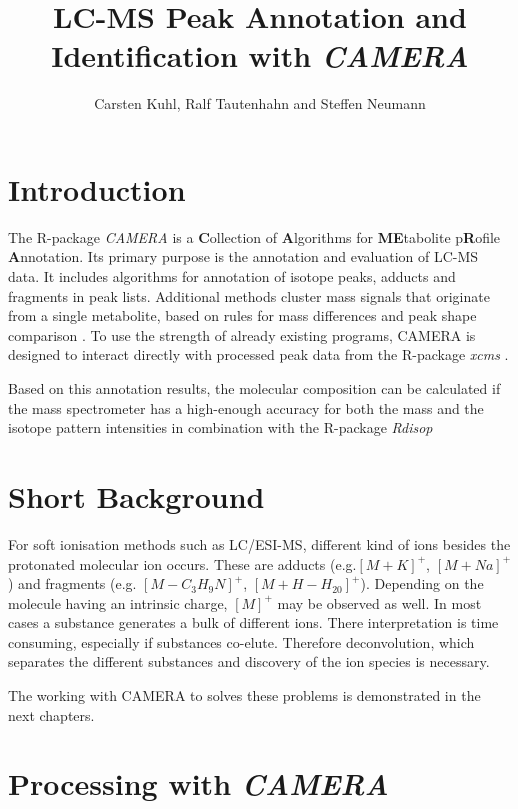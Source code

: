 \documentclass[a4paper,12pt]{article}
\newcommand{\Rpackage}[1]{{\textit{#1}}}
\begin{document}
\title{LC-MS Peak Annotation and Identification with \Rpackage{CAMERA}}
\author{Carsten Kuhl, Ralf Tautenhahn and Steffen Neumann}
\maketitle

\section{Introduction}

The R-package \Rpackage{CAMERA} is a {\bf C}ollection of {\bf
A}lgorithms for {\bf ME}tabolite p{\bf R}ofile {\bf A}nnotation. Its
primary purpose is the annotation and evaluation of LC-MS data. It includes algorithms 
for annotation of isotope peaks, adducts and fragments in peak lists. 
Additional methods cluster mass signals that originate from a single metabolite, based on
rules for mass differences and peak shape comparison \cite{annobird07}.
To use the strength of already existing programs, CAMERA is designed to interact directly with processed peak data
from the R-package \Rpackage{xcms} \cite{Smith06XCMSProcessingmass}.

Based on this annotation results, the molecular composition can be calculated
if the mass spectrometer has a high-enough accuracy for both the mass
and the isotope pattern intensities in combination with the R-package \Rpackage{Rdisop}

\section{Short Background}

For soft ionisation methods such as LC/ESI-MS, different kind of ions besides the protonated molecular ion occurs.
These are adducts (e.g.$[M+K]^+$, $[M+Na]^+ $) and fragments (e.g.  $[M-C_3H_9N]^+$,
$[M+H-H_20]^+ $). Depending on the molecule having an intrinsic
charge, $[M]^+$ may be observed as well. In most cases a substance generates a
bulk of different ions. There interpretation is time consuming, especially if
substances co-elute. Therefore deconvolution, which separates the different
substances and discovery of the ion species is necessary. 

The working with CAMERA to solves these problems is demonstrated in the next
chapters.


\section{Processing with \Rpackage{CAMERA}}
\end{document}
